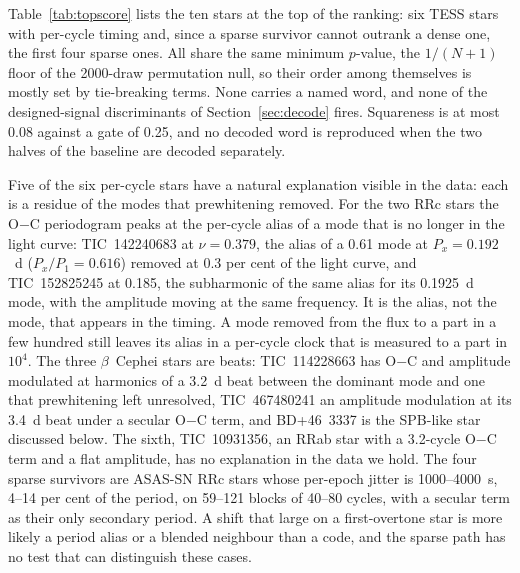 \documentclass[final,5p]{elsarticle}
\newcommand{\oc}{O$-$C}
\newcommand{\bcep}{\ensuremath{\beta}~Cephei}
\begin{document}
Table~\ref{tab:topscore} lists the ten stars at the top of the ranking: six TESS stars with per-cycle timing and, since a sparse survivor cannot outrank a dense one, the first four sparse ones. All share the same minimum $p$-value, the $1/(N+1)$ floor of the 2000-draw permutation null, so their order among themselves is mostly set by tie-breaking terms. None carries a named word, and none of the designed-signal discriminants of Section~\ref{sec:decode} fires. Squareness is at most 0.08 against a gate of 0.25, and no decoded word is reproduced when the two halves of the baseline are decoded separately.

Five of the six per-cycle stars have a natural explanation visible in the data: each is a residue of the modes that prewhitening removed. For the two RRc stars the \oc{} periodogram peaks at the per-cycle alias of a mode that is no longer in the light curve: TIC~142240683 at $\nu=0.379$, the alias of a 0.61 mode at $P_x=0.192$~d ($P_x/P_1=0.616$) removed at 0.3 per cent of the light curve, and TIC~152825245 at 0.185, the subharmonic of the same alias for its 0.1925~d mode, with the amplitude moving at the same frequency. It is the alias, not the mode, that appears in the timing. A mode removed from the flux to a part in a few hundred still leaves its alias in a per-cycle clock that is measured to a part in $10^{4}$. The three \bcep{} stars are beats: TIC~114228663 has \oc{} and amplitude modulated at harmonics of a 3.2~d beat between the dominant mode and one that prewhitening left unresolved, TIC~467480241 an amplitude modulation at its 3.4~d beat under a secular \oc{} term, and BD+46~3337 is the SPB-like star discussed below. The sixth, TIC~10931356, an RRab star with a 3.2-cycle \oc{} term and a flat amplitude, has no explanation in the data we hold. The four sparse survivors are ASAS-SN RRc stars whose per-epoch jitter is 1000--4000~s, 4--14 per cent of the period, on 59--121 blocks of 40--80 cycles, with a secular term as their only secondary period. A shift that large on a first-overtone star is more likely a period alias or a blended neighbour than a code, and the sparse path has no test that can distinguish these cases.
\end{document}

